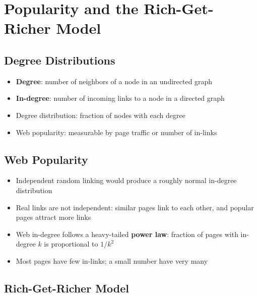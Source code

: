 \chapter{Popularity and the Rich-Get-Richer Model}

\section{Degree Distributions}

\begin{itemize}
    \item \textbf{Degree}: number of neighbors of a node in an undirected graph
    \item \textbf{In-degree}: number of incoming links to a node in a directed graph
    \item Degree distribution: fraction of nodes with each degree
    \item Web popularity: measurable by page traffic or number of in-links
\end{itemize}

\section{Web Popularity}

\begin{itemize}
    \item Independent random linking would produce a roughly normal in-degree distribution
    \item Real links are not independent: similar pages link to each other, and popular pages attract more links
    \item Web in-degree follows a heavy-tailed \textbf{power law}: fraction of pages with in-degree \(k\) is proportional to \(1/k^2\)
    \item Most pages have few in-links; a small number have very many
\end{itemize}

\section{Rich-Get-Richer Model}

